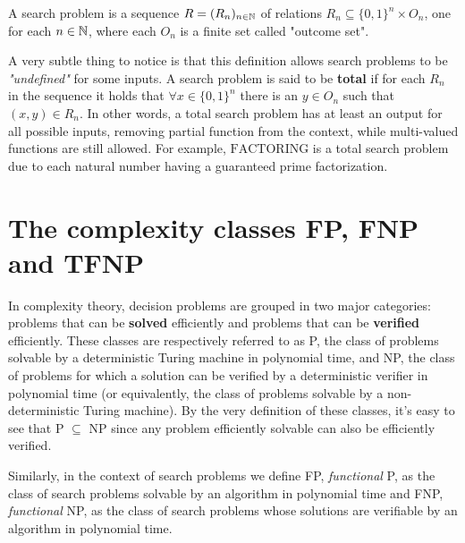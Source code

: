 \begin{definition}

    A search problem is a sequence $R = (R_n)_{n \in \mathbb{N}}$ of relations $R_n \subseteq \{0,1\}^n \times O_n$, one for each $n \in \mathbb{N}$, where each $O_n$ is a finite set called "outcome set".
\end{definition}

A very subtle thing to notice is that this definition allows search problems to be \textit{"undefined"} for some inputs. A search problem is said to be \textbf{total} if for each $R_n$ in the sequence it holds that $\forall x \in \{0,1\}^n$ there is an $y \in O_n$ such that $(x,y) \in R_n$. In other words, a total search problem has at least an output for all possible inputs, removing partial function from the context, while multi-valued functions are still allowed. For example, $\mathrm{FACTORING}$ is a total search problem due to each natural number having a guaranteed prime factorization.

\newpage

\section{The complexity classes \textsf{FP}, \textsf{FNP} and \textsf{TFNP}}

In complexity theory, decision problems are grouped in two major categories: problems that can be \textbf{solved} efficiently and problems that can be \textbf{verified} efficiently. These classes are respectively referred to as \textsf{P}, the class of problems solvable by a deterministic Turing machine in polynomial time, and \textsf{NP}, the class of problems for which a solution can be  verified  by a deterministic verifier in polynomial time (or equivalently, the class of problems solvable by a non-deterministic Turing machine). By the very definition of these classes, it's easy to see that \textsf{P} $\subseteq$ \textsf{NP} since any problem efficiently solvable can also be efficiently verified.

Similarly, in the context of search problems we define \textsf{FP}, \textit{functional} \textsf{P}, as the class of search problems solvable by an algorithm in polynomial time and \textsf{FNP}, \textit{functional} \textsf{NP}, as the class of search problems whose solutions are verifiable by an algorithm in polynomial time. 

